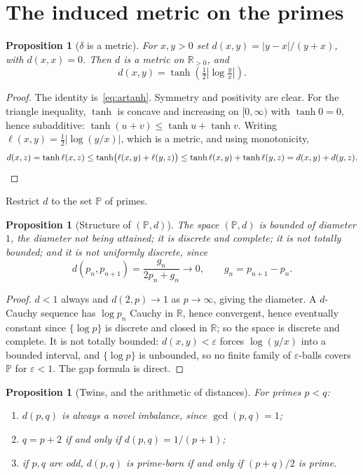 \documentclass[11pt,a4paper]{article}
\theoremstyle{plain}
\newtheorem{proposition}[theorem]{Proposition}
\theoremstyle{definition}
\theoremstyle{remark}
\newcommand{\R}{\mathbb{R}}
\begin{document}
\section{The induced metric on the primes}
\label{sec:metric}

\begin{proposition}[$\delta$ is a metric]\label{prop:metric}
For $x,y > 0$ set $d(x,y) = |y-x|/(y+x)$, with $d(x,x)=0$. Then $d$ is a metric
on $\R_{>0}$, and
\[
  d(x,y) = \tanh\!\left( \tfrac12 \left| \log \tfrac{y}{x} \right| \right).
\]
\end{proposition}

\begin{proof}
The identity is~\eqref{eq:artanh}. Symmetry and positivity are clear. For the
triangle inequality, $\tanh$ is concave and increasing on $[0,\infty)$ with
$\tanh 0 = 0$, hence subadditive: $\tanh(u+v) \le \tanh u + \tanh v$. Writing
$\ell(x,y) = \tfrac12|\log(y/x)|$, which is a metric, and using monotonicity,
\[
  d(x,z) = \tanh \ell(x,z) \le \tanh\bigl(\ell(x,y)+\ell(y,z)\bigr)
  \le \tanh\ell(x,y) + \tanh\ell(y,z) = d(x,y) + d(y,z). \qedhere
\]
\end{proof}

Restrict $d$ to the set $\mathbb{P}$ of primes.

\begin{proposition}[Structure of $(\mathbb{P},d)$]\label{prop:primespace}
The space $(\mathbb{P}, d)$ is bounded of diameter $1$, the diameter not being
attained; it is discrete and complete; it is not totally bounded; and it is not
uniformly discrete, since
\[
  d(p_n, p_{n+1}) = \frac{g_n}{2p_n + g_n} \longrightarrow 0,
  \qquad g_n = p_{n+1}-p_n .
\]
\end{proposition}

\begin{proof}
$d < 1$ always and $d(2, p) \to 1$ as $p \to \infty$, giving the diameter. A
$d$-Cauchy sequence has $\log p_n$ Cauchy in $\R$, hence convergent, hence
eventually constant since $\{\log p\}$ is discrete and closed in $\R$; so the
space is discrete and complete. It is not totally bounded: $d(x,y)<\varepsilon$
forces $\log(y/x)$ into a bounded interval, and $\{\log p\}$ is unbounded, so no
finite family of $\varepsilon$-balls covers $\mathbb{P}$ for $\varepsilon < 1$.
The gap formula is direct.
\end{proof}

\begin{proposition}[Twins, and the arithmetic of distances]\label{prop:twins}
For primes $p < q$:
\begin{enumerate}
  \item $d(p,q)$ is always a novel imbalance, since $\gcd(p,q)=1$;
  \item $q = p+2$ if and only if $d(p,q) = 1/(p+1)$;
  \item if $p,q$ are odd, $d(p,q)$ is prime-born if and only if $(p+q)/2$ is
    prime.
\end{enumerate}
\end{proposition}
\end{document}
